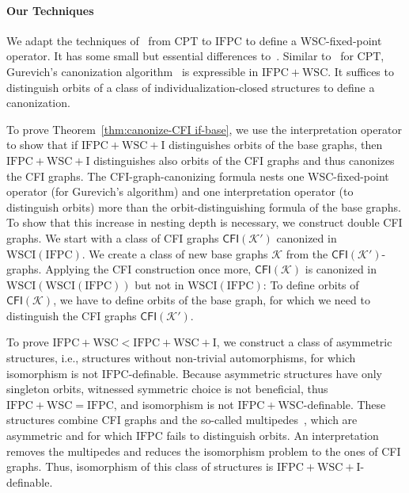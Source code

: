 \documentclass[]{lmcs}
\newcommand{\GraphClass}{\mathcal{K}}
\newcommand{\CPT}{\ensuremath{\mathrm{CPT}}}
\newcommand{\IFPC}{\ensuremath{\mathrm{IFPC}}}
\newcommand{\IFPCWSC}{\ensuremath{\mathrm{IFPC{+}WSC}}}
\newcommand{\IFPCWSCI}{\ensuremath{\mathrm{IFPC{+}WSC{+}I}}}
\newcommand{\WSCIof}[1]{\mathrm{WSCI}(#1)}
\newcommand{\CFIsym}{\mathsf{CFI}}
\newcommand{\CFI}[1]{\CFIsym(#1)}
\begin{document}
\paragraph{Our Techniques}
We adapt the techniques of~\cite{LichterSchweitzer24} from \CPT{}
to \IFPC{} to define a WSC-fixed-point operator.
It has some small but essential differences to~\cite{GireHoang98,DawarRicherby03}.
Similar to~\cite{LichterSchweitzer24} for \CPT{},
Gurevich's canonization algorithm~\cite{Gurevich97} is expressible in \IFPCWSC{}.
It suffices to distinguish orbits of a class of individualization-closed structures to define a canonization.

To prove Theorem~\ref{thm:canonize-CFI if-base},
we use the interpretation operator to show
that if \IFPCWSCI{} distinguishes orbits of the base graphs,
then \IFPCWSCI{} distinguishes also orbits of the CFI graphs
and thus canonizes the CFI graphs.
The CFI-graph-canonizing formula nests one WSC-fixed-point operator (for Gurevich's algorithm) and one interpretation operator (to distinguish orbits) more than the orbit-distinguishing formula of the base graphs.
To show that this increase in nesting depth is necessary, we construct double CFI graphs.
We start with a class of CFI graphs $\CFI{\GraphClass'}$ canonized in $\WSCIof{\IFPC}$.
We create a class of new base graphs $\GraphClass$ from the $\CFI{\GraphClass'}$-graphs.
Applying the CFI construction once more, $\CFI{\GraphClass}$ is canonized in $\WSCIof{\WSCIof{\IFPC}}$ but not in $\WSCIof{\IFPC{}}$:
To define orbits of $\CFI{\GraphClass}$,
we have to define orbits of the base graph,
for which we need to distinguish the CFI graphs $\CFI{\GraphClass'}$.

To prove $\IFPCWSC < \IFPCWSCI$,
we construct a class of asymmetric structures, i.e., structures without non-trivial automorphisms,
for which isomorphism is not \IFPC{}-definable.
Because asymmetric structures have only singleton orbits, witnessed symmetric choice is not
beneficial, thus $\IFPCWSC{} = \IFPC{}$,
and isomorphism is not \IFPCWSC{}-definable.
These structures combine CFI graphs and the so-called multipedes~\cite{GurevichShelah96},
which are asymmetric and for which \IFPC{} fails to distinguish orbits.
An interpretation removes the multipedes
and reduces the isomorphism problem to the ones of CFI graphs.
Thus,  isomorphism of this class of structures is $\IFPCWSCI{}$-definable.
\end{document}
